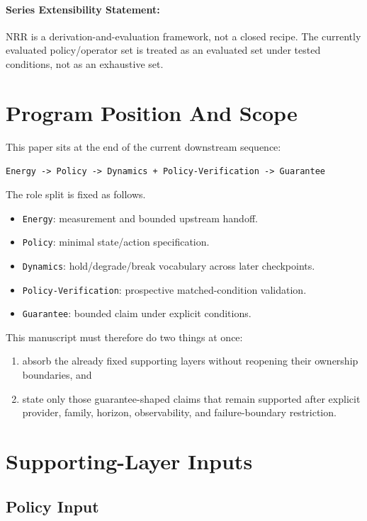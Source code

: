 \documentclass[11pt]{article}
\begin{document}
\paragraph{Series Extensibility Statement:}
NRR is a derivation-and-evaluation framework, not a closed recipe. The currently
evaluated policy/operator set is treated as an evaluated set under tested
conditions, not as an exhaustive set.

\section{Program Position And Scope}

This paper sits at the end of the current downstream sequence:

\begin{center}
\texttt{Energy -> Policy -> Dynamics + Policy-Verification -> Guarantee}
\end{center}

\noindent The role split is fixed as follows.

\begin{itemize}
\item \texttt{Energy}: measurement and bounded upstream handoff.
\item \texttt{Policy}: minimal state/action specification.
\item \texttt{Dynamics}: hold/degrade/break vocabulary across later checkpoints.
\item \texttt{Policy-Verification}: prospective matched-condition validation.
\item \texttt{Guarantee}: bounded claim under explicit conditions.
\end{itemize}

This manuscript must therefore do two things at once:
\begin{enumerate}
\item absorb the already fixed supporting layers without reopening their ownership
boundaries, and
\item state only those guarantee-shaped claims that remain supported after explicit
provider, family, horizon, observability, and failure-boundary restriction.
\end{enumerate}

\section{Supporting-Layer Inputs}

\subsection{Policy Input}
\end{document}
